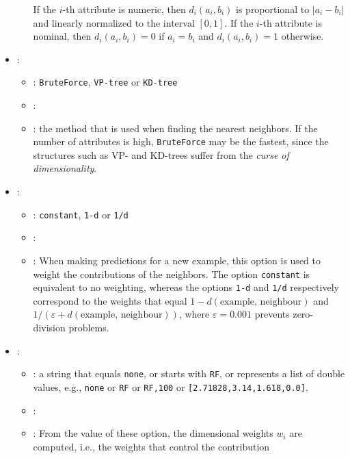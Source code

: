 \begin{itemize}
\begin{itemize}
        If the $i$-th attribute is numeric, then $d_i(a_i, b_i)$ is proportional to $|a_i - b_i|$ and linearly normalized to the interval $[0, 1]$.
        If the $i$-th attribute is nominal, then $d_i(a_i, b_i) = 0$ if $a_i = b_i$ and  $d_i(a_i, b_i) = 1$ otherwise.
    \end{itemize}
    \item {}:
    \begin{itemize}
        \item \optionPossibleValues{}: {\tt BruteForce}, {\tt VP-tree} or {\tt KD-tree}
        \item \optionDefaultValue{}: 
        \item \optionDescrption{}: the method that is used when finding the nearest neighbors. If the number of attributes is high, {\tt BruteForce}
        may be the fastest, since the structures such as VP- and KD-trees suffer from the \emph{curse of dimensionality}.
    \end{itemize}
    \item {}:
    \begin{itemize}
        \item \optionPossibleValues{}: {\tt constant}, {\tt 1-d} or {\tt 1/d}
        \item \optionDefaultValue{}: 
        \item \optionDescrption{}: When making predictions for a new example, this option is used to weight the contributions of the neighbors. The option {\tt constant}
        is equivalent to no weighting, whereas the options {\tt 1-d} and {\tt 1/d} respectively correspond to the weights that equal
        $1 - d(\text{example, neighbour})$ and $1 / (\varepsilon + d(\text{example, neighbour}))$, where $\varepsilon = 0.001$ prevents zero-division
        problems.
    \end{itemize}
    \item {}:
    \begin{itemize}
        \item \optionPossibleValues{}: a string that equals {\tt none}, or starts with {\tt RF}, or represents a list of double values, e.g.,
        {\tt none} or {\tt RF} or {\tt RF,100} or {\tt [2.71828,3.14,1.618,0.0]}.
        \item \optionDefaultValue{}: 
        \item \optionDescrption{}: From the value of these option, the dimensional weights $w_i$ are computed, i.e., the weights that control the contribution

\end{itemize}
\end{itemize}
